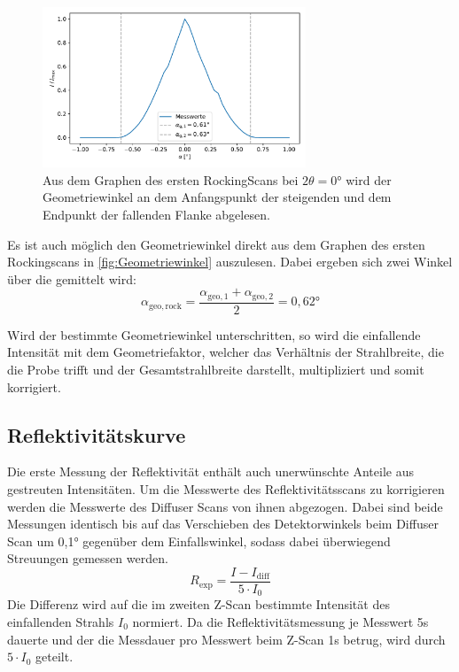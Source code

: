     \begin{figure}[ht]
        \centering
        \includegraphics[width = 0.7\textwidth]{plots/Geometriewinkel.pdf}
        \caption{Aus dem Graphen des ersten RockingScans bei $2\theta = 0°$ wird der Geometriewinkel an dem Anfangspunkt der steigenden und dem Endpunkt der fallenden Flanke abgelesen.}
        \label{fig:Geometriewinkel}
    \end{figure}
    Es ist auch möglich den Geometriewinkel direkt aus dem Graphen des ersten Rockingscans in \autoref{fig:Geometriewinkel} auszulesen. Dabei ergeben sich zwei Winkel über die gemittelt wird:
    \begin{equation*}
        \alpha_{\mathrm{geo,rock}} = \frac{\alpha_{\mathrm{geo,1}} + \alpha_{\mathrm{geo,2}}}{2} = 0,62°
    \end{equation*}

    Wird der bestimmte Geometriewinkel unterschritten, so wird die einfallende Intensität mit dem Geometriefaktor, welcher das Verhältnis der Strahlbreite, die die Probe trifft und der Gesamtstrahlbreite darstellt, multipliziert und somit korrigiert.

\subsection{Reflektivitätskurve}
    Die erste Messung der Reflektivität enthält auch unerwünschte Anteile aus gestreuten Intensitäten.
    Um die Messwerte des Reflektivitätsscans zu korrigieren werden die Messwerte des Diffuser Scans von ihnen abgezogen.
    Dabei sind beide Messungen identisch bis auf das Verschieben des Detektorwinkels beim Diffuser Scan um 0,1° gegenüber dem Einfallswinkel, sodass dabei überwiegend Streuungen gemessen werden.
    \begin{equation*}
        R_{\mathrm{exp}} = \frac{I - I_{\mathrm{diff}}}{5 \cdot I_0}
    \end{equation*}
    Die Differenz wird auf die im zweiten Z-Scan bestimmte Intensität des einfallenden Strahls $I_0$ normiert. Da die Reflektivitätsmessung je Messwert 5s dauerte und der die Messdauer pro Messwert beim Z-Scan 1s betrug, wird durch $5 \cdot I_0$ geteilt.

